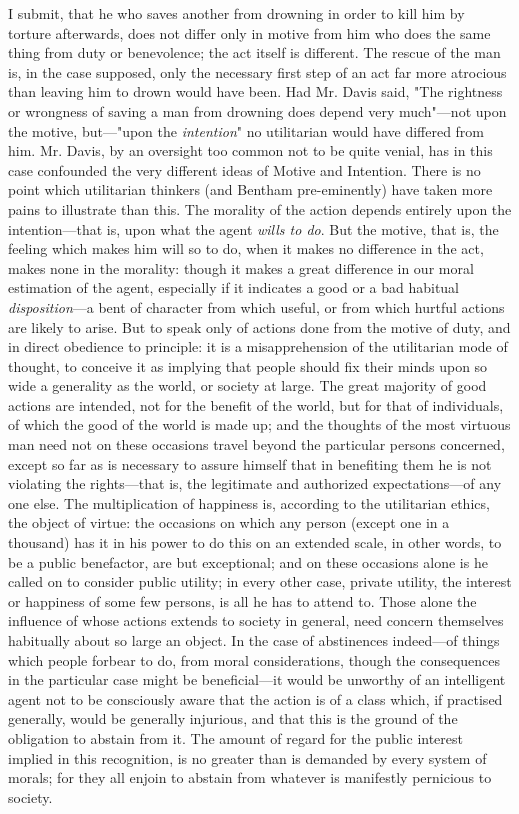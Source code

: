 \documentclass[12pt]{report}
\begin{document}
{I submit, that he who saves another from drowning in order to kill him by torture afterwards, does not differ only in motive from him who does the same thing from duty or benevolence; the act itself is different. The rescue of the man is, in the case supposed, only the necessary first step of an act far more atrocious than leaving him to drown would have been. Had Mr. Davis said, "The rightness or wrongness of saving a man from drowning does depend very much"—not upon the motive, but—"upon the \emph{intention}" no utilitarian would have differed from him. Mr. Davis, by an oversight too common not to be quite venial, has in this case confounded the very different ideas of Motive and Intention. There is no point which utilitarian thinkers (and Bentham pre-eminently) have taken more pains to illustrate than this. The morality of the action depends entirely upon the intention—that is, upon what the agent \emph{wills to do}. But the motive, that is, the feeling which makes him will so to do, when it makes no difference in the act, makes none in the morality: though it makes a great difference in our moral estimation of the agent, especially if it indicates a good or a bad habitual \emph{disposition}—a bent of character from which useful, or from which hurtful actions are likely to arise.} But to speak only of actions done from the motive of duty, and in direct obedience to principle: it is a misapprehension of the utilitarian mode of thought, to conceive it as implying that people should fix their minds upon so wide a generality as the world, or society at large. The great majority of good actions are intended, not for the benefit of the world, but for that of individuals, of which the good of the world is made up; and the thoughts of the most virtuous man need not on these occasions travel beyond the particular persons concerned, except so far as is necessary to assure himself that in benefiting them he is not violating the rights—that is, the legitimate and authorized expectations—of any one else. The multiplication of happiness is, according to the utilitarian ethics, the object of virtue: the occasions on which any person (except one in a thousand) has it in his power to do this on an extended scale, in other words, to be a public benefactor, are but exceptional; and on these occasions alone is he called on to consider public utility; in every other case, private utility, the interest or happiness of some few persons, is all he has to attend to. Those alone the influence of whose actions extends to society in general, need concern themselves habitually about so large an object. In the case of abstinences indeed—of things which people forbear to do, from moral considerations, though the consequences in the particular case might be beneficial—it would be unworthy of an intelligent agent not to be consciously aware that the action is of a class which, if practised generally, would be generally injurious, and that this is the ground of the obligation to abstain from it. The amount of regard for the public interest implied in this recognition, is no greater than is demanded by every system of morals; for they all enjoin to abstain from whatever is manifestly pernicious to society.
\end{document}
